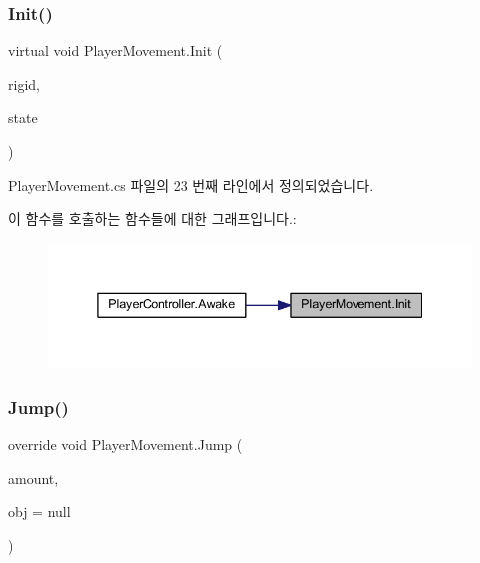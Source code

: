 \subsubsection{\texorpdfstring{Init()}{Init()}\hspace{0.1cm}{\footnotesize\ttfamily [2/2]}}
{\footnotesize\ttfamily virtual void Player\+Movement.\+Init (\begin{DoxyParamCaption}\item[{Rigidbody2D}]{rigid,  }\item[{\mbox{\hyperlink{class_player_state}{Player\+State}}}]{state }\end{DoxyParamCaption})\hspace{0.3cm}{\ttfamily [virtual]}}



Player\+Movement.\+cs 파일의 23 번째 라인에서 정의되었습니다.


\begin{DoxyCode}{0}

\end{DoxyCode}
이 함수를 호출하는 함수들에 대한 그래프입니다.\+:
\nopagebreak
\begin{figure}[H]
\begin{center}
\leavevmode
\includegraphics[width=338pt]{d0/d3d/class_player_movement_a104a453051ca7b60d6862e4deb7475b4_icgraph}
\end{center}
\end{figure}
\mbox{\label{class_player_movement_a347d6bcd5389bbc6b115c2bdf33e8f29}} 
\subsubsection{\texorpdfstring{Jump()}{Jump()}}
{\footnotesize\ttfamily override void Player\+Movement.\+Jump (\begin{DoxyParamCaption}\item[{float}]{amount,  }\item[{Game\+Object}]{obj = {\ttfamily null} }\end{DoxyParamCaption})\hspace{0.3cm}{\ttfamily [virtual]}}



